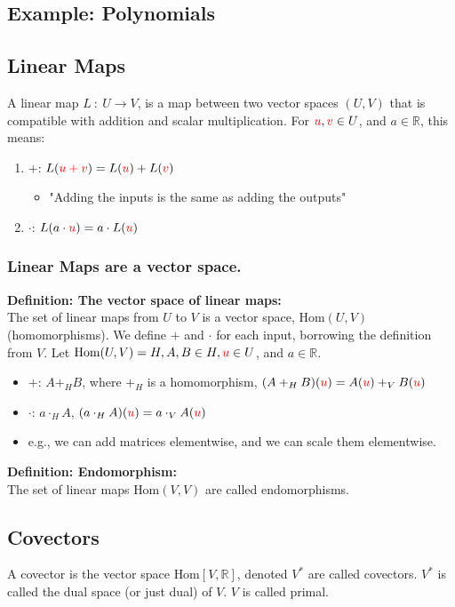 \documentclass[10pt]{article}
\newcommand{\R}{\mathbb{R}}
\begin{document}
\subsection*{Example: Polynomials}
\subsection*{Linear Maps}
A linear map $L \::\: U \rightarrow V$, is a map between two vector spaces $(U, V)$ that is compatible with addition and scalar multiplication.  For $\textcolor{red}{u}, \textcolor{red}{v} \in U$, and $a \in \R$, this means:
\begin{enumerate}
    \item $+$: $L(\textcolor{red}{u + v}) = L(\textcolor{red}{u}) + L(\textcolor{red}{v})$
    \begin{itemize}
        \item "Adding the inputs is the same as adding the outputs"
    \end{itemize}
    \item $\cdot$: $L(a \cdot \textcolor{red}{u}) = a \cdot L(\textcolor{red}{u})$
\end{enumerate}
\subsubsection*{Linear Maps are a vector space.}
\textbf{Definition: The vector space of linear maps:}\\
The set of linear maps from $U$ to $V$ is a vector space, $\text{Hom}(U, V)$ (homomorphisms).  We define $+$ and $\cdot$ for each input, borrowing the definition from $V$.  Let $\text{Hom}(U, V) = H, A, B \in H, \textcolor{red}{u} \in U$, and $a \in \R$.
\begin{itemize}
    \item $+$: $A +_H B$, where $+_H$ is a homomorphism, $(A +_H B)(\textcolor{red}{u}) = A(\textcolor{red}{u}) +_V B(\textcolor{red}{u})$
    \item $\cdot$: $a \cdot_H A$, $(a \cdot_H A)(\textcolor{red}{u}) = a \cdot_V A(\textcolor{red}{u})$
    \item e.g., we can add matrices elementwise, and we can scale them elementwise.
\end{itemize}
\textbf{Definition: Endomorphism:}\\
The set of linear maps $\text{Hom}(V, V)$ are called endomorphisms.
\subsection*{Covectors}
A covector is the vector space $\text{Hom}[V, \R]$, denoted $V^*$ are called covectors.  $V^*$ is called the dual space (or just dual) of $V$.  $V$ is called primal.
\end{document}
